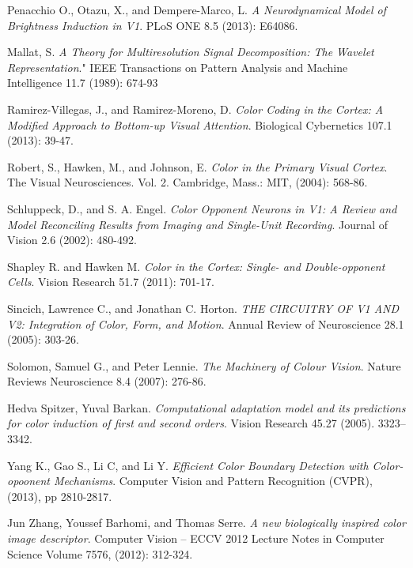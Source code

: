 \documentclass[journal,onecolumn]{IEEEtran}
\begin{document}
\begin{thebibliography}{1}
    Penacchio O., Otazu, X., and Dempere-Marco, L.
    \emph{A Neurodynamical Model of Brightness Induction in V1}.
    PLoS ONE 8.5 (2013): E64086.

    Mallat, S.
    \emph{A Theory for Multiresolution Signal Decomposition: The Wavelet Representation}."
    IEEE Transactions on Pattern Analysis and Machine Intelligence 11.7 (1989): 674-93

    Ramirez-Villegas, J., and Ramirez-Moreno, D.
    \emph{Color Coding in the Cortex: A Modified Approach to Bottom-up Visual Attention}.
    Biological Cybernetics 107.1 (2013): 39-47.

    Robert, S., Hawken, M., and Johnson, E.
    \emph{Color in the Primary Visual Cortex}.
    The Visual Neurosciences. Vol. 2.
    Cambridge, Mass.: MIT, (2004): 568-86.

    Schluppeck, D., and S. A. Engel.
    \emph{Color Opponent Neurons in V1: A Review and Model Reconciling Results from Imaging and Single-Unit Recording}.
    Journal of Vision 2.6 (2002): 480-492.

    Shapley R. and Hawken M.
    \emph{Color in the Cortex: Single- and Double-opponent Cells}.
    Vision Research 51.7 (2011): 701-17.

    Sincich, Lawrence C., and Jonathan C. Horton.
    \emph{THE CIRCUITRY OF V1 AND V2: Integration of Color, Form, and Motion}.
    Annual Review of Neuroscience 28.1 (2005): 303-26.
    
    Solomon, Samuel G., and Peter Lennie.
    \emph{The Machinery of Colour Vision}.
    Nature Reviews Neuroscience 8.4 (2007): 276-86.

    Hedva Spitzer, Yuval Barkan.
    \emph{Computational adaptation model and its predictions for color induction of first and second orders}.
    Vision Research 45.27 (2005). 3323–3342.

    Yang K., Gao S., Li C, and Li Y.
    \emph{Efficient Color Boundary Detection with Color-opoonent Mechanisms}.
    Computer Vision and Pattern Recognition (CVPR), (2013), pp 2810-2817.

    Jun Zhang, Youssef Barhomi, and Thomas Serre.
    \emph{A new biologically inspired color image descriptor}.
    Computer Vision – ECCV 2012
    Lecture Notes in Computer Science Volume 7576, (2012): 312-324.

\end{thebibliography}
\end{document}
